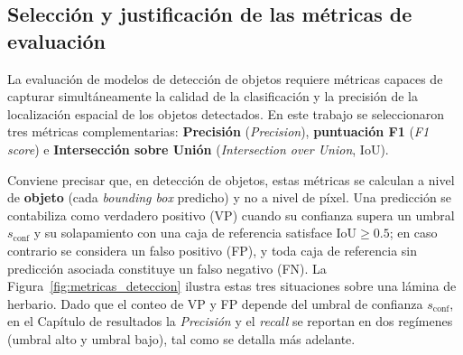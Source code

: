 \subsection{Selección y justificación de las métricas de evaluación}
 
La evaluación de modelos de detección de objetos requiere métricas capaces de capturar
simultáneamente la calidad de la clasificación y la precisión de la localización espacial
de los objetos detectados. En este trabajo se seleccionaron tres métricas complementarias:
\textbf{Precisión} (\textit{Precision}), \textbf{puntuación F1} (\textit{F1 score}) e
\textbf{Intersección sobre Unión} (\textit{Intersection over Union}, IoU).

Conviene precisar que, en detección de objetos, estas métricas se calculan a nivel de
\textbf{objeto} (cada \textit{bounding box} predicho) y no a nivel de píxel. Una predicción
se contabiliza como verdadero positivo (VP) cuando su confianza supera un umbral
$s_{\text{conf}}$ y su solapamiento con una caja de referencia satisface
$\mathrm{IoU} \ge 0.5$; en caso contrario se considera un falso positivo (FP), y toda caja
de referencia sin predicción asociada constituye un falso negativo (FN). La
Figura~\ref{fig:metricas_deteccion} ilustra estas tres situaciones sobre una lámina de
herbario. Dado que el conteo de VP y FP depende del umbral de confianza $s_{\text{conf}}$,
en el Capítulo de resultados la \textit{Precisión} y el \textit{recall} se reportan en dos
regímenes (umbral alto y umbral bajo), tal como se detalla más adelante.

